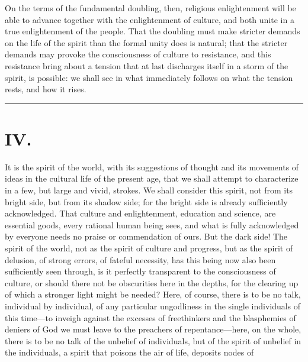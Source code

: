 \documentclass[12pt]{book}
\newcommand{\opage}[1]{\marginnote{\footnotesize\textit{[#1]}}}
\begin{document}
On the terms of the fundamental doubling, then, religious enlightenment
will be able to advance together with the enlightenment of culture, and
both unite in a true enlightenment of the people. That the doubling must
make stricter demands on the life of the spirit than the formal unity
does is natural; that the stricter demands may provoke the consciousness
of culture to resistance, and this resistance bring about a tension that
at last discharges itself in a storm of the spirit, is possible: we
shall see in what immediately follows on what the tension rests, and how
it rises.

\begin{center}\rule{3cm}{0.4pt}\end{center}

\chapter*{IV.}
\label{ch:iv}
\opage{54}\setcounter{footnote}{0}%
It is the spirit of the world, with its suggestions of thought and its
movements of ideas in the cultural life of the present age, that we shall
attempt to characterize in a few, but large and vivid, strokes. We shall
consider this spirit, not from its bright side, but from its shadow side;
for the bright side is already sufficiently acknowledged. That culture
and enlightenment, education and science, are essential goods, every
rational human being sees, and what is fully acknowledged by everyone
needs no praise or commendation of ours. But the dark side! The spirit
of the world, not as the spirit of culture and progress,
but as the spirit of delusion, of strong errors, of fateful necessity,
has this being now also been sufficiently seen through, is it perfectly
transparent to the consciousness of culture, or should there not be
obscurities here in the depths, for the clearing up of which a stronger
light might be needed? Here, of course, there is to be no talk,
individual by individual, of any particular ungodliness in the single
individuals of this time---to inveigh against the excesses of
freethinkers and the blasphemies of deniers of God we must leave to the
preachers of repentance---here, on the whole, there is to be no talk of
the unbelief of individuals, but of the spirit of unbelief in the
individuals, a spirit that poisons the air of life, deposits nodes of
\end{document}
